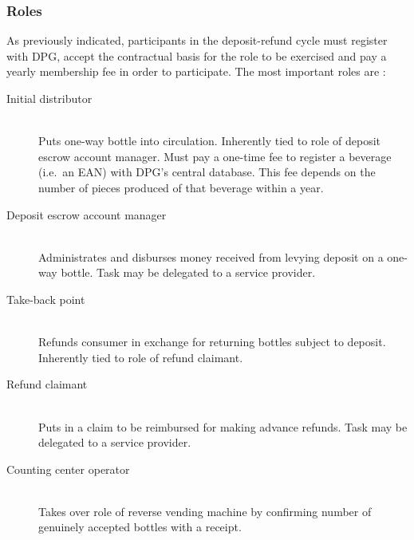 \subsubsection{Roles}
\label{sec:DPGRoles}
As previously indicated, participants in the deposit-refund cycle must register with \ac{DPG}, accept the contractual basis for the role to be exercised and pay a yearly membership fee in order to participate. The most important roles are  \cite[pp.~15--16]{Hartlep2011Recycling}:   

\begin{description}
	\item[Initial distributor]
	\hfill \\
	Puts one-way bottle into circulation. Inherently tied to role of deposit escrow account manager. Must pay a one-time fee to register a beverage (i.e.~an \acs{EAN}) with \ac{DPG}'s central database. This fee depends on the number of pieces produced of that beverage within a year.
	\item[Deposit escrow account manager]
	\hfill \\
	Administrates and disburses money received from levying deposit on a one-way bottle. Task may be delegated to a service provider.
	\item[Take-back point]
	\hfill \\
	Refunds consumer in exchange for returning bottles subject to deposit. Inherently tied to role of refund claimant.
	\item[Refund claimant]
	\hfill \\
	Puts in a claim to be reimbursed for making advance refunds. Task may be delegated to a service provider.
	\item[Counting center operator]
	\hfill \\
	Takes over role of reverse vending machine by confirming number of genuinely accepted bottles with a receipt. 
	
\end{description}

